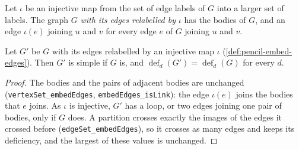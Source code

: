 \begin{definition}
  \label{def:pencil-embed-edges}
  \leanok
  Let $\iota$ be an injective map from the set of edge labels of $G$ into
  a larger set of labels. The graph $G$ \emph{with its edges relabelled
  by $\iota$} has the bodies of $G$, and an edge $\iota(e)$ joining $u$
  and $v$ for every edge $e$ of $G$ joining $u$ and $v$.
\end{definition}

\begin{lemma}
  \label{lem:embed-edges-simple-deficiency}
  \leanok
  Let $G'$ be $G$ with its edges relabelled by an injective map $\iota$
  (\cref{def:pencil-embed-edges}). Then $G'$ is simple if $G$ is, and
  $\operatorname{def}_d(G') = \operatorname{def}_d(G)$ for every $d$.
\end{lemma}
\begin{proof}
  \leanok
  The bodies and the pairs of adjacent bodies are unchanged
  (\texttt{vertexSet\_\allowbreak{}embedEdges},
  \texttt{embedEdges\_\allowbreak{}isLink}): the edge $\iota(e)$ joins
  the bodies that $e$ joins. As $\iota$ is injective, $G'$ has a loop, or
  two edges joining one pair of bodies, only if $G$ does. A partition
  crosses exactly the images of the edges it crossed before
  (\texttt{edgeSet\_\allowbreak{}embedEdges}), so it crosses as many
  edges and keeps its deficiency, and the largest of these values is
  unchanged.
\end{proof}


